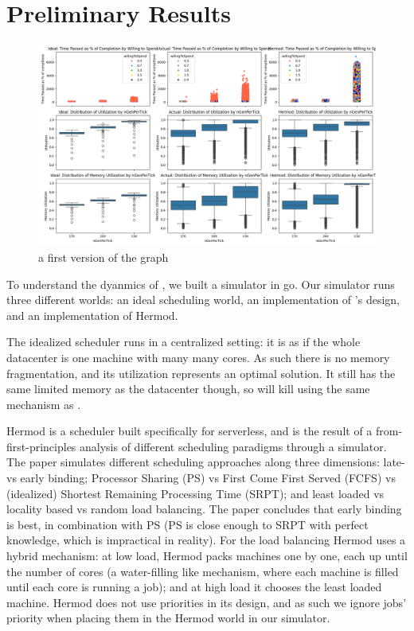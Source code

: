 \section{Preliminary Results}

\begin{figure}[t!]
    \centering
      \includegraphics[width=15cm]{img/combined_res.png}
      \caption{ a first version of the graph }
    \label{fig:graph}
\end{figure}

To understand the dyanmics of \sys{}, we built a simulator in go\cite{TODO}. Our
simulator runs three different worlds: an ideal scheduling world, an
implementation of \sys{}'s design, and an implementation of Hermod\cite{TODO}. 

The idealized scheduler runs in a centralized setting: it is as if the whole
datacenter is one machine with many many cores. As such there is no memory
fragmentation, and its utilization represents an optimal solution. It still has
the same limited memory as the datacenter though, so will kill using the same
mechanism as \sys{}.

Hermod is a scheduler built specifically for serverless, and is the result of a
from-first-principles analysis of different scheduling paradigms through a
simulator. The paper simulates different scheduling approaches along three
dimensions: late-vs early binding; Processor Sharing (PS) vs First Come First
Served (FCFS) vs (idealized) Shortest Remaining Processing Time (SRPT); and
least loaded vs locality based vs random load balancing. The paper concludes
that early binding is best, in combination with PS (PS is close enough to SRPT
with perfect knowledge, which is impractical in reality). For the load balancing
Hermod uses a hybrid mechanism: at low load, Hermod packs machines one by one,
each up until the number of cores (a water-filling like mechanism, where each
machine is filled until each core is running a job); and at high load it chooses
the least loaded machine. Hermod does not use priorities in its design, and as
such we ignore jobs' priority when placing them in the Hermod world in our
simulator.


